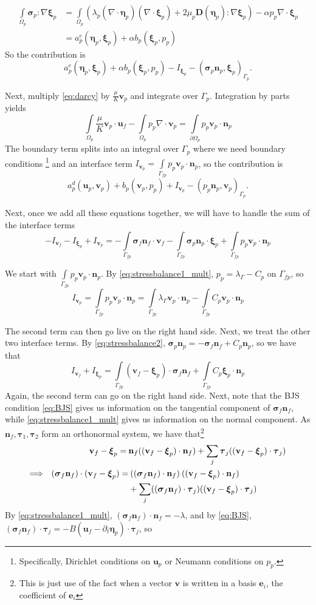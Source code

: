 \documentclass{article}
\newcommand{\mathspace}[1]{\ensuremath{#1}\xspace} %
\newcommand{\D}{\mathspace{\mathbf{D}}}
\newcommand{\sigmabf}{\mathspace{\boldsymbol{\sigma}}}
\newcommand{\grad}{\mathspace{\nabla}}
\renewcommand{\div}{\mathspace{\nabla \cdot}}
\newcommand{\ddt}[1]{\mathspace{\partial_t #1}}
\newcommand{\taubf}{\mathspace{\boldsymbol{\tau}}}
\newcommand{\darcy}{\mathspace{\Omega_{p}}}
\newcommand{\darcybdy}{\mathspace{\Gamma_{p}}}
\newcommand{\interface}{\mathspace{\Gamma_{fp}}}
\newcommand{\nf}{\mathspace{\mathbf{n}_f}}
\newcommand{\np}{\mathspace{\mathbf{n}_p}}
\newcommand{\intD}{\mathspace{\int \limits_{\darcy}}}
\newcommand{\intDbdyI}{\mathspace{\int \limits_{\partial \darcy}}}
\newcommand{\intI}{\mathspace{\int \limits_{\interface}}}
\newcommand{\uf}{\mathspace{\mathbf{u}_f}}
\newcommand{\vf}{\mathspace{\mathbf{v}_f}}
\newcommand{\up}{\mathspace{\mathbf{u}_p}}
\newcommand{\vp}{\mathspace{\mathbf{v}_p}}
\newcommand{\pp}{\mathspace{p_p}}
\newcommand{\disp}{\mathspace{\boldsymbol{\eta}_p}}
\newcommand{\disptest}{\mathspace{\boldsymbol{\xi}_p}}
\newcommand{\mult}{\mathspace{\lambda_{\Gamma}}}
\begin{document}
\begin{align*}
  \intD \sigmabf_p \colon \grad \disptest &=  \intD  \left ( \lambda_p (\div \disp)(\div \disptest)  + 2 \mu_p \D(\disp) \colon \grad \disptest \right)
                                            - \alpha \pp \div \disptest \\
                                          &= a^e_p(\disp, \disptest) + \alpha b_p(\disptest, \pp)
\end{align*}
So the contribution is $$a^e_p(\disp, \disptest) + \alpha b_p(\disptest, \pp) - I_{\disptest} - (\sigmabf_p\np, \disptest)_{\darcybdy}.$$

Next, multiply \eqref{eq:darcy} by $\frac {\mu} {K} \vp$ and integrate over \darcybdy. Integration by parts yields
$$ \intD \frac {\mu} {K} \vp \cdot \uf -  \intD \pp \div \vp = \intDbdyI \pp \vp \cdot \np$$ 
The boundary term splits into an integral over \darcybdy where we need boundary conditions \footnote{Specifically, Dirichlet conditions on \up or Neumann conditions on \pp.} and an interface term $I_{\vp} = \intI \pp \vp \cdot \np$, so the contribution is
$$a_p^d(\up, \vp) + b_p(\vp, \pp) + I_{\vp} - (\pp \np, \vp)_{\darcybdy}.$$

Next, once we add all these equations together, we will have to handle the sum of the interface terms $$-I_{\vf} - I_{\disptest} + I_{\vp} = -\intI \sigmabf_f \nf \cdot \vf -\intI \sigmabf_p \np \cdot \disptest + \intI \pp \vp \cdot \np$$

We start with $\intI \pp \vp \cdot \np$. By \eqref{eq:stressbalance1_mult}, $\pp = \mult - C_p$ on \interface, so
$$I_{\vp} = \intI \pp \vp \cdot \np = \intI \mult \vp \cdot \np - \intI C_p \vp \cdot \np$$

The second term can then go live on the right hand side. Next, we treat the other two interface terms. By \eqref{eq:stressbalance2}, $\sigmabf_p \np = - \sigmabf_f \nf + C_p \np$, so we have that $$I_{\vf} + I_{\disptest} = \intI (\vf - \disptest) \cdot \sigmabf_f \nf + \intI C_p \disptest \cdot  \np$$
Again, the second term can go on the right hand side. Next, note that the BJS condition \eqref{eq:BJS} gives us information on the tangential component of $\sigmabf_f \nf$, while \eqref{eq:stressbalance1_mult} gives us information on the normal component. As $\nf, \taubf_1, \taubf_2$ form an orthonormal system, we have that\footnote{This is just use of the fact when a vector $\mathbf{v}$ is written in a basis $\mathbf{e}_i$, the coefficient of $\mathbf{e}_i$    }
\begin{align*}
  \vf - \disptest = \: &\nf ((\vf - \disptest) \cdot \nf) + \sum_j \taubf_j ((\vf - \disptest) \cdot \taubf_j) \\
  \Longrightarrow \hspace{0.02\textwidth}  (\sigmabf_f \nf) \cdot (\vf - \disptest) = & \: ((\sigmabf_f \nf) \cdot \nf) \: ((\vf - \disptest) \cdot \nf) \\
  & + \sum_j ((\sigmabf_f \nf) \cdot \taubf_j) ((\vf - \disptest) \cdot \taubf_j)
\end{align*}
By \eqref{eq:stressbalance1_mult}, $(\sigmabf_f \nf) \cdot \nf = -\lambda$, and by \eqref{eq:BJS}, $(\sigmabf_f \nf) \cdot \taubf_j = -B \left ( \uf - \ddt{\disp} \right ) \cdot \taubf_j$, so
\end{document}
